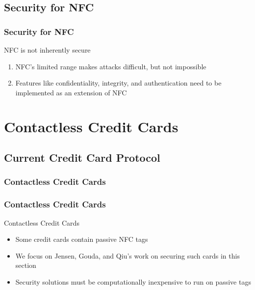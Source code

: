 \documentclass[unknownkeysallowed]{beamer}
\begin{document}
\subsection{Security for NFC}
\begin{frame}
\frametitle{Security for NFC}
  \begin{center}
  \begin{minipage}{.7\textwidth}
  \begin{block}{NFC is not inherently secure}
    \begin{enumerate}
      \item{NFC's limited range makes attacks difficult, but not impossible}
      \item{Features like confidentiality, integrity, and authentication need to be implemented as an extension of NFC}
    \end{enumerate}
  \end{block}
  \end{minipage}
  \end{center}
\end{frame}

\section{Contactless Credit Cards}
\subsection{Current Credit Card Protocol}
\begin{frame}
  \frametitle{Contactless Credit Cards}
    \begin{center}\begin{minipage}{.9\textwidth}
    \tableofcontents[currentsubsection, hideothersubsections, sectionstyle=show/shaded]
    \end{minipage}\end{center}
\end{frame}
%
\begin{frame}
\frametitle{Contactless Credit Cards}
  \begin{center}
  \begin{minipage}{.9\textwidth}
  \begin{block}{Contactless Credit Cards}
    \begin{itemize}
      \item{Some credit cards contain passive NFC tags}
      \item{We focus on Jensen, Gouda, and Qiu's work on securing such cards in this section}
      \item{Security solutions must be computationally inexpensive to run on passive tags}
    \end{itemize}
  \end{block}
  \end{minipage}
  \end{center}
\end{frame}
\end{document}
